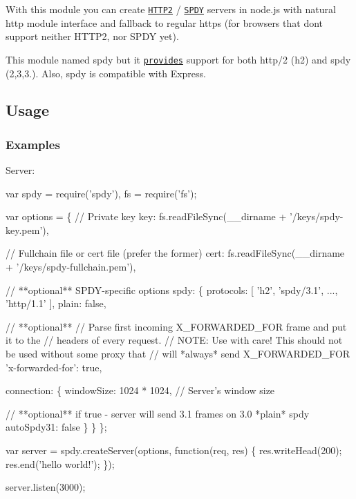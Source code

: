 \href{http://travis-ci.org/spdy-http2/node-spdy}{\tt } \href{http://badge.fury.io/js/spdy}{\tt } \href{https://david-dm.org/spdy-http2/node-spdy}{\tt } \href{http://standardjs.com/}{\tt } \href{https://waffle.io/spdy-http2/node-spdy}{\tt }

With this module you can create \href{https://http2.github.io/}{\tt H\+T\+T\+P2} / \href{http://www.chromium.org/spdy}{\tt S\+P\+DY} servers in node.\+js with natural http module interface and fallback to regular https (for browsers that don\textquotesingle{}t support neither H\+T\+T\+P2, nor S\+P\+DY yet).

This module named {\ttfamily spdy} but it \href{https://github.com/indutny/node-spdy/issues/269#issuecomment-239014184}{\tt provides} support for both http/2 (h2) and spdy (2,3,3.). Also, {\ttfamily spdy} is compatible with Express.

\subsection*{Usage}

\subsubsection*{Examples}

Server\+: 
\begin{DoxyCode}
var spdy = require('spdy'),
    fs = require('fs');

var options = \{
  // Private key
  key: fs.readFileSync(\_\_dirname + '/keys/spdy-key.pem'),

  // Fullchain file or cert file (prefer the former)
  cert: fs.readFileSync(\_\_dirname + '/keys/spdy-fullchain.pem'),

  // **optional** SPDY-specific options
  spdy: \{
    protocols: [ 'h2', 'spdy/3.1', ..., 'http/1.1' ],
    plain: false,

    // **optional**
    // Parse first incoming X\_FORWARDED\_FOR frame and put it to the
    // headers of every request.
    // NOTE: Use with care! This should not be used without some proxy that
    // will *always* send X\_FORWARDED\_FOR
    'x-forwarded-for': true,

    connection: \{
      windowSize: 1024 * 1024, // Server's window size

      // **optional** if true - server will send 3.1 frames on 3.0 *plain* spdy
      autoSpdy31: false
    \}
  \}
\};

var server = spdy.createServer(options, function(req, res) \{
  res.writeHead(200);
  res.end('hello world!');
\});

server.listen(3000);
\end{DoxyCode}


